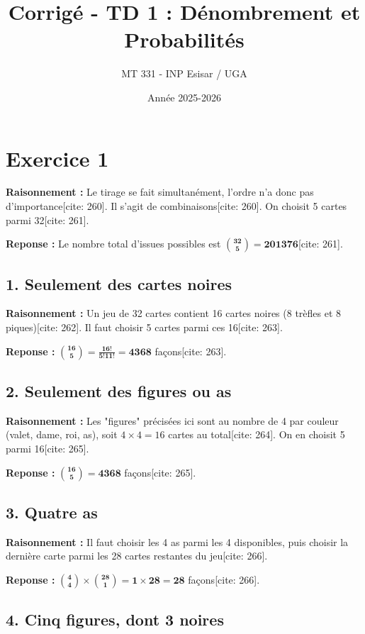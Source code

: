 \documentclass[11pt,a4paper]{article}
\title{Corrigé - TD 1 : Dénombrement et Probabilités}
\author{MT 331 - INP Esisar / UGA}
\date{Année 2025-2026}
\begin{document}
\maketitle

\section*{Exercice 1}

\textbf{Raisonnement :} Le tirage se fait simultanément, l'ordre n'a donc pas d'importance[cite: 260]. Il s'agit de combinaisons[cite: 260]. On choisit 5 cartes parmi 32[cite: 261].

\textbf{Reponse :} Le nombre total d'issues possibles est $\mathbf{\binom{32}{5} = 201376}$[cite: 261].

\subsection*{1. Seulement des cartes noires}

\textbf{Raisonnement :} Un jeu de 32 cartes contient 16 cartes noires (8 trèfles et 8 piques)[cite: 262]. Il faut choisir 5 cartes parmi ces 16[cite: 263].

\textbf{Reponse :} $\mathbf{\binom{16}{5} = \frac{16!}{5!11!} = 4368}$ façons[cite: 263].

\subsection*{2. Seulement des figures ou as}

\textbf{Raisonnement :} Les "figures" précisées ici sont au nombre de 4 par couleur (valet, dame, roi, as), soit $4 \times 4 = 16$ cartes au total[cite: 264]. On en choisit 5 parmi 16[cite: 265].

\textbf{Reponse :} $\mathbf{\binom{16}{5} = 4368}$ façons[cite: 265].

\subsection*{3. Quatre as}

\textbf{Raisonnement :} Il faut choisir les 4 as parmi les 4 disponibles, puis choisir la dernière carte parmi les 28 cartes restantes du jeu[cite: 266].

\textbf{Reponse :} $\mathbf{\binom{4}{4} \times \binom{28}{1} = 1 \times 28 = 28}$ façons[cite: 266].

\subsection*{4. Cinq figures, dont 3 noires}
\end{document}
